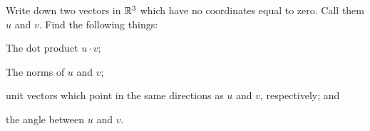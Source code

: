 \documentclass[elementsmain.tex]{subfiles}
\begin{document}
\begin{exercise}
Write down two vectors in $\mathbb{R}^3$ which have no coordinates equal to zero. Call them $u$ and $v$. Find the following things:
\begin{compactitem}
\item The dot product $u\cdot v$;
\item The norms of $u$ and $v$;
\item unit vectors which point in the same directions as $u$ and $v$, respectively; and
\item the angle between $u$ and $v$.
\end{compactitem}
\end{exercise}
\end{document}
